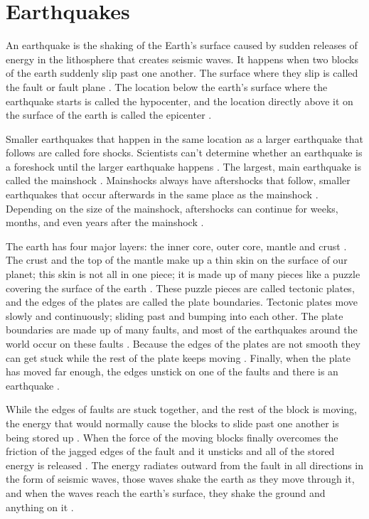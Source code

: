 \documentclass[]{llncs} %
\begin{document}
\section{Earthquakes}
An earthquake is the shaking of the Earth's surface caused by sudden releases of energy in the lithosphere that creates seismic waves. It happens when two blocks of the earth suddenly slip past one another. The surface where they slip is called the fault or fault plane \cite{Wald}. The location below the earth’s surface where the earthquake starts is called the hypocenter, and the location directly above it on the surface of the earth is called the epicenter \cite{Wald}. \par
Smaller earthquakes that happen in the same location as a larger earthquake that follows are called fore shocks. Scientists can’t determine whether an earthquake is a foreshock until the larger earthquake happens \cite{Wald}. The largest, main earthquake is called the mainshock \cite{Wald}. Mainshocks always have aftershocks that follow, smaller earthquakes that occur afterwards in the same place as the mainshock \cite{Wald}. Depending on the size of the mainshock, aftershocks can continue for weeks, months, and even years after the mainshock \cite{Wald}.\par
The earth has four major layers: the inner core, outer core, mantle and crust \cite{Wald}. The crust and the top of the mantle make up a thin skin on the surface of our planet; this skin is not all in one piece; it is made up of many pieces like a puzzle covering the surface of the earth \cite{Wald}. These puzzle pieces are called tectonic plates, and the edges of the plates are called the plate boundaries. Tectonic plates move slowly and continuously; sliding past and bumping into each other. The plate boundaries are made up of many faults, and most of the earthquakes around the world occur on these faults \cite{Wald}. Because the edges of the plates are not smooth they can get stuck while the rest of the plate keeps moving \cite{Wald}. Finally, when the plate has moved far enough, the edges unstick on one of the faults and there is an earthquake \cite{Wald}. \par
While the edges of faults are stuck together, and the rest of the block is moving, the energy that would normally cause the blocks to slide past one another is being stored up \cite{Wald}. When the force of the moving blocks finally overcomes the friction of the jagged edges of the fault and it unsticks and all of the stored energy is released \cite{Wald}. The energy radiates outward from the fault in all directions in the form of seismic waves, those waves shake the earth as they move through it, and when the waves reach the earth’s surface, they shake the ground and anything on it \cite{Wald}. \par
\end{document}
